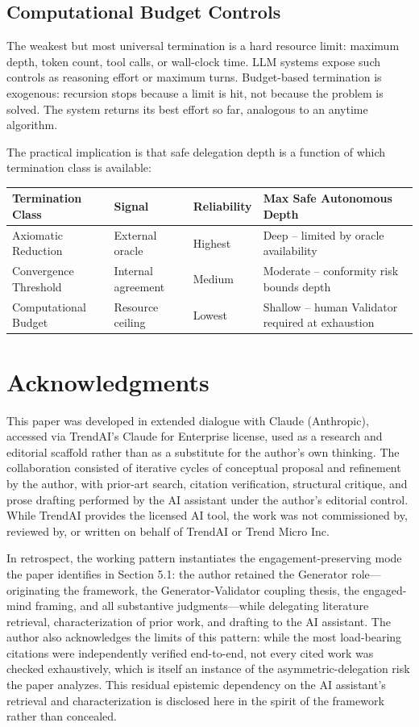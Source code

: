 \documentclass[11pt,a4paper]{article}
\begin{document}
\subsection{Computational Budget Controls}
The weakest but most universal termination is a hard resource limit: maximum depth, token count, tool calls, or wall-clock time. LLM systems expose such controls as reasoning effort or maximum turns. Budget-based termination is exogenous: recursion stops because a limit is hit, not because the problem is solved. The system returns its best effort so far, analogous to an anytime algorithm.

The practical implication is that safe delegation depth is a function of which termination class is available:

\begin{center}
\begin{tabular}{|l|l|l|l|}
\hline
Termination Class & Signal & Reliability & Max Safe Autonomous Depth \\
\hline
Axiomatic Reduction & External oracle & Highest & Deep -- limited by oracle availability \\
Convergence Threshold & Internal agreement & Medium & Moderate -- conformity risk bounds depth \\
Computational Budget & Resource ceiling & Lowest & Shallow -- human Validator required at exhaustion \\
\hline
\end{tabular}
\end{center}

\section*{Acknowledgments}
This paper was developed in extended dialogue with Claude (Anthropic), accessed via TrendAI's Claude for Enterprise license, used as a research and editorial scaffold rather than as a substitute for the author's own thinking. The collaboration consisted of iterative cycles of conceptual proposal and refinement by the author, with prior-art search, citation verification, structural critique, and prose drafting performed by the AI assistant under the author's editorial control. While TrendAI provides the licensed AI tool, the work was not commissioned by, reviewed by, or written on behalf of TrendAI or Trend Micro Inc.

In retrospect, the working pattern instantiates the engagement-preserving mode the paper identifies in Section 5.1: the author retained the Generator role---originating the framework, the Generator-Validator coupling thesis, the engaged-mind framing, and all substantive judgments---while delegating literature retrieval, characterization of prior work, and drafting to the AI assistant. The author also acknowledges the limits of this pattern: while the most load-bearing citations were independently verified end-to-end, not every cited work was checked exhaustively, which is itself an instance of the asymmetric-delegation risk the paper analyzes. This residual epistemic dependency on the AI assistant's retrieval and characterization is disclosed here in the spirit of the framework rather than concealed.
\end{document}
